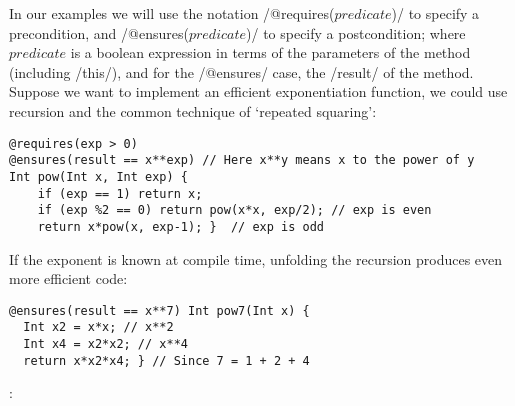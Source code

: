 In our examples we will use the notation /@requires($predicate$)/ 
to specify a precondition, and /@ensures($predicate$)/ 
to specify a postcondition; where $predicate$ is a boolean expression
in terms of the parameters of the method (including /this/), and for the /@ensures/ case, the /result/ of the method.
Suppose we want to implement an efficient exponentiation function, we could use recursion and the common technique of `repeated squaring':
\vspace{-1ex}
\begin{lstlisting}
@requires(exp > 0)
@ensures(result == x**exp) // Here x**y means x to the power of y
Int pow(Int x, Int exp) {
	if (exp == 1) return x;
	if (exp %2 == 0) return pow(x*x, exp/2); // exp is even
	return x*pow(x, exp-1); }  // exp is odd
\end{lstlisting}
If the exponent is known at compile time,
unfolding the recursion produces even more efficient code:
\vspace{-1ex}
\begin{lstlisting}[firstnumber=7]
@ensures(result == x**7) Int pow7(Int x) { 
  Int x2 = x*x; // x**2
  Int x4 = x2*x2; // x**4
  return x*x2*x4; } // Since 7 = 1 + 2 + 4
\end{lstlisting}
\vspace{-1ex}
:
\vspace{-1ex}
